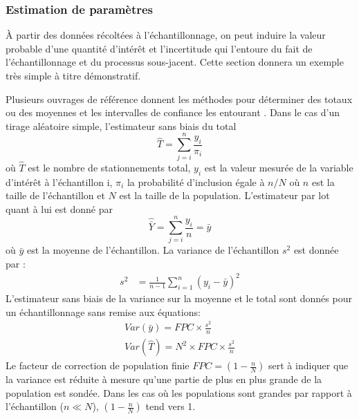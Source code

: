             \subsubsection{Estimation de paramètres}
                À partir des données récoltées à l'échantillonnage, on peut induire la valeur probable d'une quantité d'intérêt et l'incertitude qui l'entoure du fait de l'échantillonnage et du processus sous-jacent. Cette section donnera un exemple très simple à titre démonstratif. \par
                Plusieurs ouvrages de référence donnent les méthodes pour déterminer des totaux ou des moyennes et les intervalles de confiance les entourant  \parencite{hines_probabilites_2005,tille_theorie_2019,ardilly_techniques_2006}.  Dans le cas d'un tirage aléatoire simple, l’estimateur sans biais du total 
                \begin{equation}
                    \hat{T} = \sum_{j=i}^n \frac{y_{i}}{\pi_i} 
                \end{equation} où $\hat{T}$ est le nombre de stationnements total, $y_{i}$ est la valeur mesurée de la variable d'intérêt à l'échantillon i, $\pi_{i}$ la probabilité d'inclusion égale à $n/N$ où $n$ est la taille de l'échantillon et $N$ est la taille de la population. L'estimateur par lot quant à lui est donné par 
                \begin{equation}
                    \hat{\bar{Y}} = \sum_{j=i}^n \frac{y_{i}}{n} = \bar{y}
                \end{equation}
                où $\bar{y}$ est la moyenne de l'échantillon.
                La variance de l'échantillon $s^2$ \parencite{ardilly_techniques_2006}  est donnée par :
                \begin{align}
                    s^2 &= \frac{1}{n-1}\sum_{i=1}^{n} \left(y_{i}-\bar{y}\right)^2
                \end{align}
                L'estimateur sans biais de la variance sur la moyenne et le total sont donnés pour un échantillonnage sans remise aux équations:
                \begin{align}
                    Var(\bar{y}) = FPC \times \frac{s^2}{n}\\
                    Var(\hat{T}) = N^2 \times FPC \times \frac{s^2}{n}
                \end{align}
                Le facteur de correction de population finie $FPC =\left(1-\frac{n}{N}\right)$ sert à indiquer que la variance est réduite à mesure qu'une partie de plus en plus grande de la population est sondée. Dans les cas où les populations sont grandes par rapport à l'échantillon ($n\ll N$), $\left(1-\frac{n}{N}\right)$ tend vers 1.  
